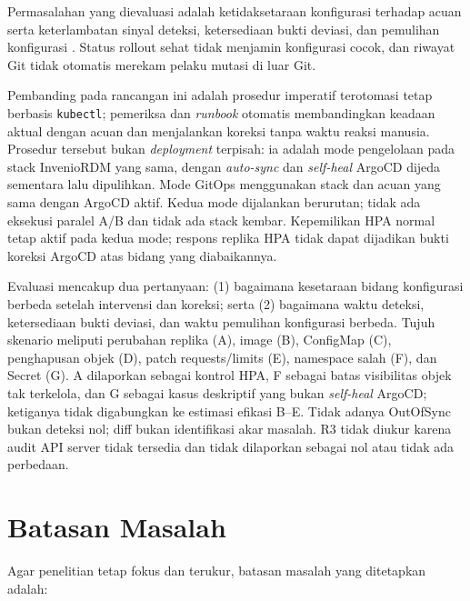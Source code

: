 Permasalahan yang dievaluasi adalah ketidaksetaraan konfigurasi terhadap acuan serta keterlambatan sinyal deteksi, ketersediaan bukti deviasi, dan pemulihan konfigurasi \citep{zhang2026configuration,rahman2023security,pohjola2025mitigating}. Status rollout sehat tidak menjamin konfigurasi cocok, dan riwayat Git tidak otomatis merekam pelaku mutasi di luar Git.

Pembanding pada rancangan ini adalah prosedur imperatif terotomasi tetap berbasis \texttt{kubectl}; pemeriksa dan \textit{runbook} otomatis membandingkan keadaan aktual dengan acuan dan menjalankan koreksi tanpa waktu reaksi manusia. Prosedur tersebut bukan \textit{deployment} terpisah: ia adalah mode pengelolaan pada stack InvenioRDM yang sama, dengan \textit{auto-sync} dan \textit{self-heal} ArgoCD dijeda sementara lalu dipulihkan. Mode GitOps menggunakan stack dan acuan yang sama dengan ArgoCD aktif. Kedua mode dijalankan berurutan; tidak ada eksekusi paralel A/B dan tidak ada stack kembar. Kepemilikan HPA normal tetap aktif pada kedua mode; respons replika HPA tidak dapat dijadikan bukti koreksi ArgoCD atas bidang yang diabaikannya.

Evaluasi mencakup dua pertanyaan: (1) bagaimana kesetaraan bidang konfigurasi berbeda setelah intervensi dan koreksi; serta (2) bagaimana waktu deteksi, ketersediaan bukti deviasi, dan waktu pemulihan konfigurasi berbeda. Tujuh skenario meliputi perubahan replika (A), image (B), ConfigMap (C), penghapusan objek (D), patch requests/limits (E), namespace salah (F), dan Secret (G). A dilaporkan sebagai kontrol HPA, F sebagai batas visibilitas objek tak terkelola, dan G sebagai kasus deskriptif yang bukan \textit{self-heal} ArgoCD; ketiganya tidak digabungkan ke estimasi efikasi B--E. Tidak adanya OutOfSync bukan deteksi nol; diff bukan identifikasi akar masalah. R3 tidak diukur karena audit API server tidak tersedia dan tidak dilaporkan sebagai nol atau tidak ada perbedaan.

\section{Batasan Masalah}

Agar penelitian tetap fokus dan terukur, batasan masalah yang ditetapkan adalah:

